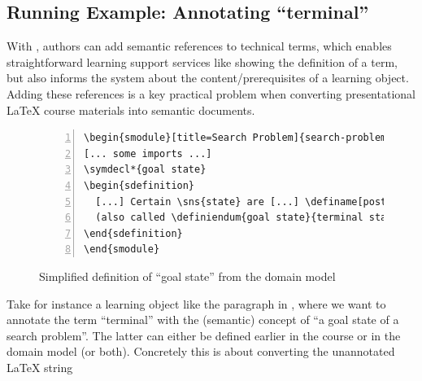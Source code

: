 \documentclass[runningheads]{llncs}
\begin{document}
\subsection{Running Example: Annotating ``terminal''}
With \sTeX, authors can add semantic references to technical terms,
which enables straightforward learning support services like
showing the definition of a term, but also informs the system
about the content/prerequisites of a learning object.
Adding these references is a key practical problem when converting presentational {\LaTeX}
course materials into semantic documents.
\begin{figure}[h]\centering
\begin{lstlisting}[morekeywords={definame,symdecl,definiendum},numbers=left,
escapechar=!]
\begin{smodule}[title=Search Problem]{search-problem}
[... some imports ...]
\symdecl*{goal state}
\begin{sdefinition}
  [...] Certain \sns{state} are [...] \definame[post=s]{goal state} [...]
  (also called \definiendum{goal state}{terminal states}).
\end{sdefinition}
\end{smodule}
\end{lstlisting}
  \caption{Simplified definition of ``goal state'' from the domain model}\label{fig:state-space}
\end{figure}

Take for instance a learning object like the paragraph in , where we want to annotate the
term ``terminal'' with the (semantic) concept of ``a goal state of a search problem''. The
latter can either be defined earlier in the course or in the domain model (or
both). Concretely this is about converting the unannotated {\LaTeX} string
\end{document}
